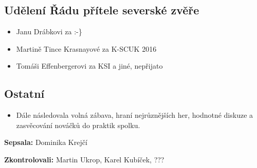 \documentclass[11pt,a4paper]{article}
\begin{document}
\subsection*{Udělení Řádu přítele severské zvěře}
\begin{itemize}[itemsep=0pt]
\item Janu Drábkovi za  :-\}
\item Martině Tince Krasnayové za K-SCUK 2016
\item Tomáši Effenbergerovi za KSI a jiné, nepřijato
\end{itemize}

\subsection*{Ostatní}
\begin{itemize}[itemsep=0pt]
\item Dále následovala volná zábava, hraní nejrůznějších her, hodnotné diskuze a zasvěcování nováčků do praktik spolku.
\end{itemize}

\textbf{Sepsala:} Dominika Krejčí

\textbf{Zkontrolovali:} Martin Ukrop, Karel Kubíček, ???
\end{document}
